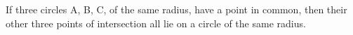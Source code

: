 If three circles A, B, C, of the same radius, have a point in common, then their 
other three points of intersection all lie on a circle of the same radius.